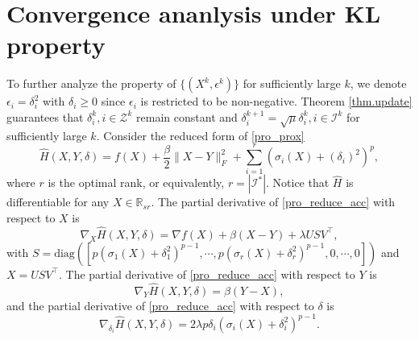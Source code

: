 \documentclass[twoside,11pt]{article}
\newcommand{\Ical}{\mathcal{I}}
\newcommand{\Zcal}{\mathcal{Z}}
\numberwithin{equation}{section}
\begin{document}
 \section{Convergence ananlysis under KL property}


 To further analyze the property of $\{ (X^{k},\epsilon^{k})\} $ for sufficiently large $k$, we denote $\epsilon_{i} = \delta_{i}^{2} $ with $\delta_{i}\ge0$ since $\epsilon_{i} $ is restricted to be non-negative.  
 Theorem \ref{thm.update} guarantees that $\delta_i^k , i\in\Zcal^k$ remain constant 
 and $\delta_i^{k+1} = \sqrt{\mu}\delta_i^k, i\in \Ical^k$ for sufficiently large $k$. 
 Consider the reduced form of  \eqref{pro_prox} 
 \begin{equation}\label{pro_reduce_acc}
   \hat{H} (X,Y,\delta) = f (X) + \frac{\beta}{2}\|X-Y\|_{F}^{2}+\sum\limits_{i=1}^{r} \left(\sigma_{i} (X)+ (\delta_{i})^{2}\right)^{p},
 \end{equation}
 where $r$ is the optimal rank, or equivalently, $r = |\Ical^*|$. Notice that 
 $\hat H$ is differentiable for any $X\in \mathbb{R}_{sr}$.  
 The partial derivative  of \eqref{pro_reduce_acc} with respect to $X $ is 
 \begin{equation}\label{acc_px}
   \nabla_{X} \hat{H} (X,Y,\delta) = \nabla f (X)+\beta (X-Y)+\lambda U  S V^{\top},
 \end{equation}
 with $S= \text{diag}( [p (\sigma_{1} (X)+\delta_{1}^{2})^{p-1},\cdots,p (\sigma_{r} (X)+\delta_{r}^{2})^{p-1},0,\cdots,0]) $ and $X=U S V^{\top} $. 
 The partial derivative of \eqref{pro_reduce_acc} with respect to $Y $ is 
 \begin{equation}
     \nabla_{Y} \hat{H} (X,Y,\delta) = \beta (Y-X),  
 \end{equation}
 and the partial derivative of \eqref{pro_reduce_acc} with respect to $\delta $ is
 \begin{equation}
   \nabla_{\delta_{i}}\hat{H} (X,Y,\delta) = 2\lambda p\delta_{i} (\sigma_{i} (X)+\delta_{i}^{2})^{p-1}. 
 \end{equation} 
 
\end{document}
